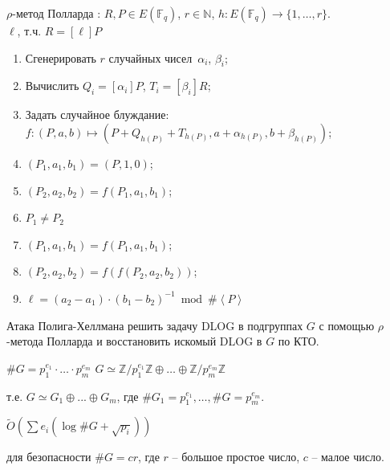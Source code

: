 \documentclass{beamer}
\begin{document}
\begin{frame}{$\rho$-метод Полларда}
		: $R, P \in E(\mathbb{F}_q)$, $r \in \mathbb{N}$, $h: E(\mathbb{F}_q) \rightarrow \{1, \ldots, r\}$. \\
	 $\ell$, т.ч. $R = [\ell] P$\\
	\begin{enumerate}
		\item Сгенерировать $r$ случайных чисел~$\alpha_i$, $\beta_i$;
		\item Вычислить $Q_i = [\alpha_i] P$, $T_i = [\beta_i] R$;
		\item Задать случайное блуждание: $f: (P, a, b) \mapsto (P + Q_{h(P)} + T_{h(P)}, a+\alpha_{h(P)}, b +\beta_{h(P)})$;
		\item $(P_1, a_1, b_1) = (P, 1, 0)$;
		\item $(P_2, a_2, b_2) = f(P_1, a_1, b_1)$;
		\item {} $P_1 \neq P_2$ 
		\item \quad $(P_1, a_1, b_1) = f(P_1, a_1, b_1)$;
		\item \quad $(P_2, a_2, b_2) = f(f(P_2, a_2, b_2))$;
		\item {} $\ell = (a_2 - a_1) \cdot (b_1 - b_2)^{-1} \bmod \#\left<P\right>$
	\end{enumerate}
\end{frame}

\begin{frame}{Атака Полига-Хеллмана}
     решить задачу DLOG в подгруппах $G$ с помощью $\rho$-метода Полларда и восстановить искомый DLOG в $G$ по КТО.
    \begin{center}
        $\#G = p_1^{e_1} \cdot \ldots \cdot p_m^{e_m}$ \structure{$\implies$} $G \simeq \mathbb{Z} / p_1^{e_1} \mathbb{Z} \oplus \ldots \oplus \mathbb{Z} / p_m^{e_m} \mathbb{Z}$
    \end{center}
    
        т.е. $G \simeq G_1 \oplus ... \oplus G_m$, где $\#G_1 = p_1^{e_1}, \ldots, \#G = p_m^{e_m}$.
    
    \vspace{1em}
    
     $\widetilde{O}(\sum e_i (\log{\#G} + \sqrt{p_i}))$
    
    \begin{center}
        \structure{$\Downarrow$}
    \end{center}
    
     для безопасности $\#G = c r$, где $r$ -- большое простое число, $c$ -- малое число.
\end{frame}
\end{document}
